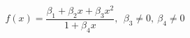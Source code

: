 

\[
f(x) = \frac{\beta_1 + \beta_2x + \beta_3x^2}{1 + \beta_4x}, \ \ \beta_3 \neq 0, \ \beta_4 \neq 0
\]


